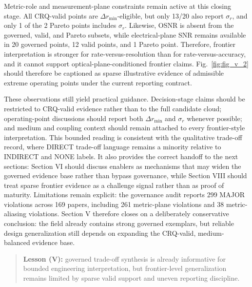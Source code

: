 Metric-role and measurement-plane constraints remain active at this closing stage. All CRQ-valid points are $\Delta r_{\min}$-eligible, but only 13/20 also report $\sigma_r$, and only 1 of the 2 Pareto points includes $\sigma_r$. Likewise, OSNR is absent from the governed, valid, and Pareto subsets, while electrical-plane SNR remains available in 20 governed points, 12 valid points, and 1 Pareto point. Therefore, frontier interpretation is stronger for rate-versus-resolution than for rate-versus-accuracy, and it cannot support optical-plane-conditioned frontier claims. Fig.~\ref{fig:fig_v_2} should therefore be captioned as sparse illustrative evidence of admissible extreme operating points under the current reporting contract.

These observations still yield practical guidance. Decision-stage claims should be restricted to CRQ-valid evidence rather than to the full candidate cloud; operating-point discussions should report both $\Delta r_{\min}$ and $\sigma_r$ whenever possible; and medium and coupling context should remain attached to every frontier-style interpretation. This bounded reading is consistent with the qualitative trade-off record, where DIRECT trade-off language remains a minority relative to INDIRECT and NONE labels. It also provides the correct handoff to the next sections: Section VI should discuss enablers as mechanisms that may widen the governed evidence base rather than bypass governance, while Section VIII should treat sparse frontier evidence as a challenge signal rather than as proof of maturity. Limitations remain explicit: the governance audit reports 299 MAJOR violations across 169 papers, including 261 metric-plane violations and 38 metric-aliasing violations. Section V therefore closes on a deliberately conservative conclusion: the field already contains strong governed exemplars, but reliable design generalization still depends on expanding the CRQ-valid, medium-balanced evidence base.

\begin{quote}
\textbf{Lesson (V):} governed trade-off synthesis is already informative for bounded engineering interpretation, but frontier-level generalization remains limited by sparse valid support and uneven reporting discipline.
\end{quote}
